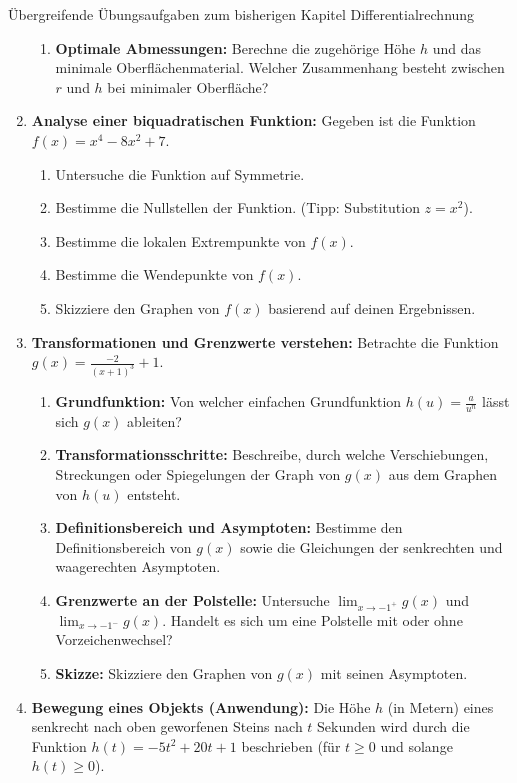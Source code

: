 \begin{aufgabenumgebung}[A:DiffUebergreifend]{Übergreifende Übungsaufgaben zum bisherigen Kapitel Differentialrechnung}
\begin{enumerate}
\begin{enumerate}
            \item \textbf{Optimale Abmessungen:} Berechne die zugehörige Höhe $h$ und das minimale Oberflächenmaterial. Welcher Zusammenhang besteht zwischen $r$ und $h$ bei minimaler Oberfläche?
        \end{enumerate}
    \item \textbf{Analyse einer biquadratischen Funktion:}
        Gegeben ist die Funktion $f(x) = x^4 - 8x^2 + 7$.
        \begin{enumerate}
            \item Untersuche die Funktion auf Symmetrie.
            \item Bestimme die Nullstellen der Funktion. (Tipp: Substitution $z=x^2$).
            \item Bestimme die lokalen Extrempunkte von $f(x)$.
            \item Bestimme die Wendepunkte von $f(x)$.
            \item Skizziere den Graphen von $f(x)$ basierend auf deinen Ergebnissen.
        \end{enumerate}
    \item \textbf{Transformationen und Grenzwerte verstehen:}
        Betrachte die Funktion $g(x) = \frac{-2}{(x+1)^3} + 1$.
        \begin{enumerate}
            \item \textbf{Grundfunktion:} Von welcher einfachen Grundfunktion $h(u) = \frac{a}{u^n}$ lässt sich $g(x)$ ableiten?
            \item \textbf{Transformationsschritte:} Beschreibe, durch welche Verschiebungen, Streckungen oder Spiegelungen der Graph von $g(x)$ aus dem Graphen von $h(u)$ entsteht.
            \item \textbf{Definitionsbereich und Asymptoten:} Bestimme den Definitionsbereich von $g(x)$ sowie die Gleichungen der senkrechten und waagerechten Asymptoten.
            \item \textbf{Grenzwerte an der Polstelle:} Untersuche $\lim_{x \to -1^+} g(x)$ und $\lim_{x \to -1^-} g(x)$. Handelt es sich um eine Polstelle mit oder ohne Vorzeichenwechsel?
            \item \textbf{Skizze:} Skizziere den Graphen von $g(x)$ mit seinen Asymptoten.
        \end{enumerate}
    \item \textbf{Bewegung eines Objekts (Anwendung):}
        Die Höhe $h$ (in Metern) eines senkrecht nach oben geworfenen Steins nach $t$ Sekunden wird durch die Funktion $h(t) = -5t^2 + 20t + 1$ beschrieben (für $t \ge 0$ und solange $h(t) \ge 0$).

\end{enumerate}
\end{aufgabenumgebung}
